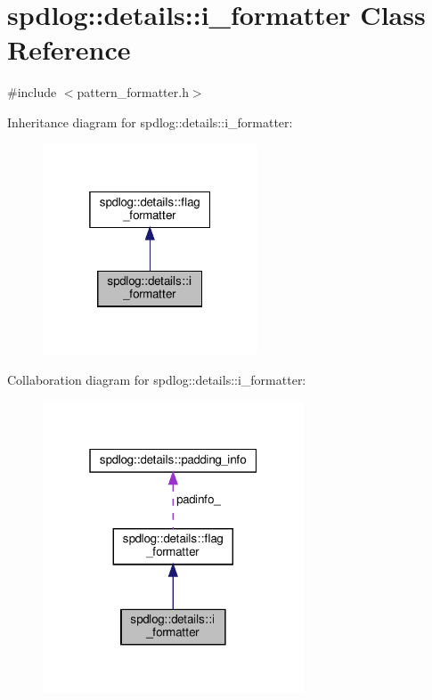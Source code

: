 \hypertarget{classspdlog_1_1details_1_1i__formatter}{}\section{spdlog\+:\+:details\+:\+:i\+\_\+formatter Class Reference}
\label{classspdlog_1_1details_1_1i__formatter}


{\ttfamily \#include $<$pattern\+\_\+formatter.\+h$>$}



Inheritance diagram for spdlog\+:\+:details\+:\+:i\+\_\+formatter\+:
\nopagebreak
\begin{figure}[H]
\begin{center}
\leavevmode
\includegraphics[width=181pt]{classspdlog_1_1details_1_1i__formatter__inherit__graph}
\end{center}
\end{figure}


Collaboration diagram for spdlog\+:\+:details\+:\+:i\+\_\+formatter\+:
\nopagebreak
\begin{figure}[H]
\begin{center}
\leavevmode
\includegraphics[width=220pt]{classspdlog_1_1details_1_1i__formatter__coll__graph}
\end{center}
\end{figure}
